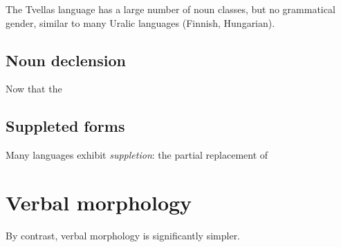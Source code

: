 The Tvellas language has a large number of noun classes, but no grammatical gender, similar to many
Uralic languages (Finnish, Hungarian).

\subsection{Noun declension}

Now that the 

\subsection{Suppleted forms}

Many languages exhibit \textit{suppletion}: the partial replacement of 

\section{Verbal morphology}

By contrast, verbal morphology is significantly simpler.

